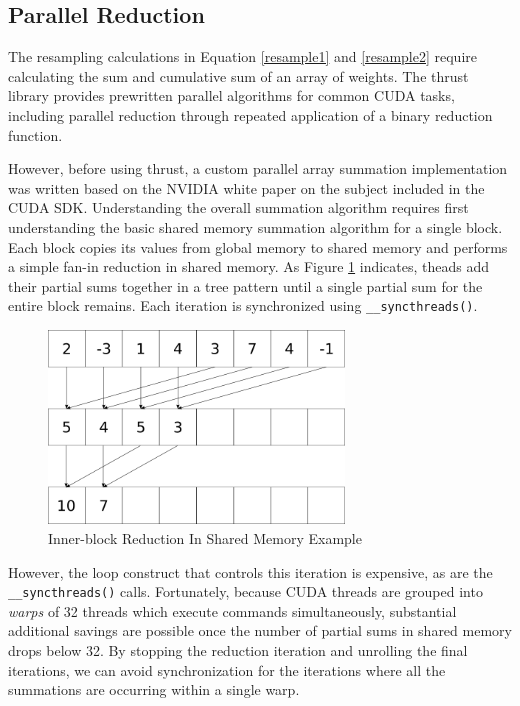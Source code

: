 \documentclass{article}
\begin{document}
\subsection{Parallel Reduction}
The resampling calculations in Equation \ref{resample1} and \ref{resample2} require calculating the sum and cumulative sum of an array of weights. The thrust library provides prewritten parallel algorithms for common CUDA tasks, including parallel reduction through repeated application of a binary reduction function.\cite{thrust}

However, before using thrust, a custom parallel array summation implementation was written based on the NVIDIA white paper on the subject included in the CUDA SDK.\cite{oprc} Understanding the overall summation algorithm requires first understanding the basic shared memory summation algorithm for a single block. Each block copies its values from global memory to shared memory and performs a simple fan-in reduction in shared memory. As Figure \ref{sum1} indicates, theads add their partial sums together in a tree pattern until a single partial sum for the entire block remains. Each iteration is synchronized using \verb!__syncthreads()!.

\begin{figure}
\centering
\includegraphics[width=0.7\textwidth]{data/summation.png}
\caption{Inner-block Reduction In Shared Memory Example}
\label{sum1}
\end{figure}


However, the loop construct that controls this iteration is expensive, as are the \verb!__syncthreads()! calls. Fortunately, because CUDA threads are grouped into \emph{warps} of 32 threads which execute commands simultaneously, substantial additional savings are possible once the number of partial sums in shared memory drops below 32. By stopping the reduction iteration and unrolling the final iterations, we can avoid synchronization for the iterations where all the summations are occurring within a single warp.
\end{document}
